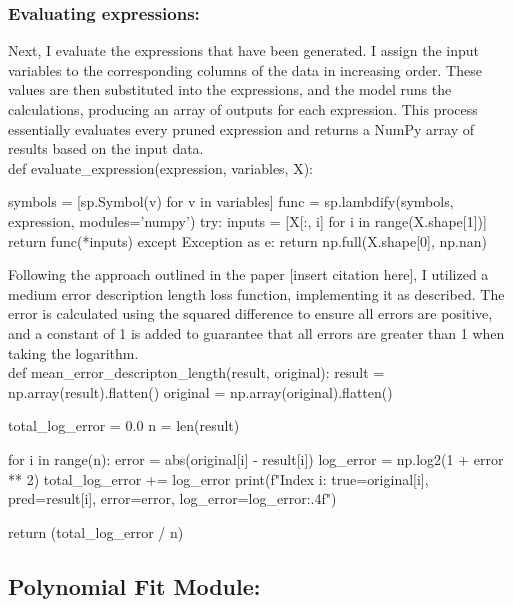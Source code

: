\documentclass{article}
\begin{document}
\subsubsection{Evaluating expressions:}


Next, I evaluate the expressions that have been generated. I assign the input variables to the corresponding columns of the data in increasing order. These values are then substituted into the expressions, and the model runs the calculations, producing an array of outputs for each expression. This process essentially evaluates every pruned expression and returns a NumPy array of results based on the input data.\\

def evaluate_expression(expression, variables, X): 
    
    symbols = [sp.Symbol(v) for v in variables]
    func = sp.lambdify(symbols, expression, modules='numpy')
    try:
        inputs = [X[:, i] for i in range(X.shape[1])]
        return func(*inputs)
    except Exception as e:
        return np.full(X.shape[0], np.nan)
    


Following the approach outlined in the paper [insert citation here], I utilized a medium error description length loss function, implementing it as described. The error is calculated using the squared difference to ensure all errors are positive, and a constant of 1 is added to guarantee that all errors are greater than 1 when taking the logarithm.\\


def mean_error_descripton_length(result, original):
    result = np.array(result).flatten()
    original = np.array(original).flatten()

    total_log_error = 0.0
    n = len(result)

    for i in range(n):
        error = abs(original[i] - result[i])
        log_error = np.log2(1 + error ** 2)
        total_log_error += log_error
        print(f"Index {i}: true={original[i]}, pred={result[i]}, error={error}, log_error={log_error:.4f}")

    return (total_log_error / n)






\subsection{Polynomial Fit Module: }
\end{document}
